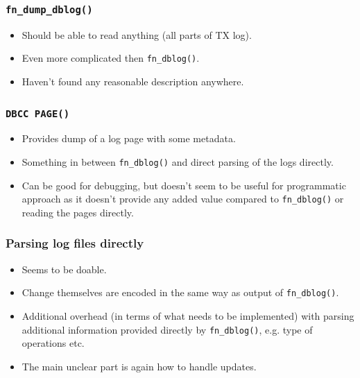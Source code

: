 \documentclass[10pt,utf8]{beamer}
\begin{document}
\begin{frame}
    \frametitle{\texttt{fn\_dump\_dblog()}}
    \begin{itemize}
        \item Should be able to read anything (all parts of TX log).
        \item Even more complicated then \texttt{fn\_dblog()}.
        \item Haven’t found any reasonable description anywhere.
    \end{itemize}
\end{frame}

\begin{frame}
    \frametitle{\texttt{DBCC PAGE()}}
    \begin{itemize}
        \item Provides dump of a log page with some metadata.
        \item Something in between \texttt{fn\_dblog()} and direct parsing of the logs directly.
        \item Can be good for debugging, but doesn’t seem to be useful for programmatic approach as it doesn’t provide any added value compared to \texttt{fn\_dblog()} or reading the pages directly.
    \end{itemize}
\end{frame}

\begin{frame}
    \frametitle{Parsing log files directly}
    \begin{itemize}
        \item Seems to be doable.
        \item Change themselves are encoded in the same way as output of \texttt{fn\_dblog()}.
        \item Additional overhead (in terms of what needs to be implemented) with parsing additional information provided directly by \texttt{fn\_dblog()}, e.g. type of operations etc.
        \item The main unclear part is again how to handle updates.
    \end{itemize}
\end{frame}
\end{document}
